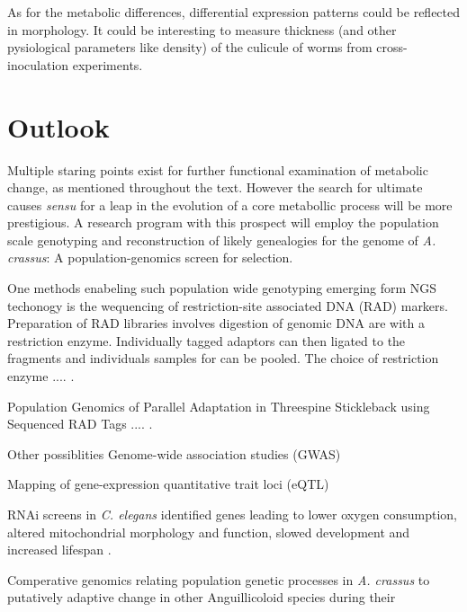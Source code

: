 As for the metabolic differences, differential expression patterns
could be reflected in morphology. It could be interesting to measure
thickness (and other pysiological parameters like density) of the
culicule of worms from cross-inoculation experiments.

\section{Outlook}

Multiple staring points exist for further functional examination of
metabolic change, as mentioned throughout the text. However the search
for ultimate causes \textit{sensu} \cite{mayr1961cause} for a leap in
the evolution of a core metabollic process will be more prestigious. A
research program with this prospect will employ the population scale
genotyping and reconstruction of likely genealogies for the genome of
\textit{A. crassus}: A population-genomics screen for selection.

One methods enabeling such population wide genotyping emerging form
NGS techonogy is the wequencing of restriction-site associated DNA
(RAD) markers. Preparation of RAD libraries involves digestion of
genomic DNA are with a restriction enzyme. Individually tagged
adaptors can then ligated to the fragments and individuals samples for
can be pooled. The choice of restriction enzyme .... \cite{pmid18852878}.

Population Genomics of Parallel Adaptation in Threespine Stickleback
using Sequenced RAD Tags ....  \cite{pmid20195501}.


Other possiblities Genome-wide association studies (GWAS)

Mapping of gene-expression quantitative trait loci (eQTL) 


RNAi screens in \textit{C. elegans} identified genes leading to lower
oxygen consumption, altered mitochondrial morphology and function,
slowed development and increased lifespan \cite{pmid12447374}.

Comperative genomics relating population genetic processes in
\textit{A. crassus} to putatively adaptive change in other
Anguillicoloid species during their 




